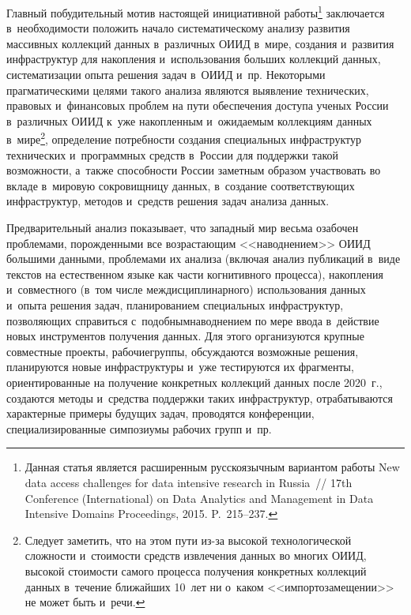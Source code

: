\begin{multicols}{2}
  Главный побудительный мотив настоящей инициативной работы\footnote{Данная статья 
является расширенным русскоязычным вариантом работы  New data access challenges for data 
intensive research in Russia~// 17th Conference (International) on Data Analytics 
and Management in Data Intensive Domains Proceedings, 2015. P.~215--237.} заключается в~необходимости положить начало 
систематическому анализу развития массивных коллекций данных в~различных ОИИД 
в~мире, создания и~развития инфраструктур для накопления и~использования больших 
коллекций данных, систематизации опыта решения задач в~ОИИД и~пр. Некоторыми 
прагматическими целями такого анализа являются выявление технических, правовых 
и~финансовых проблем на пути обеспечения доступа ученых России в~различных ОИИД 
к~уже накопленным и~ожидаемым коллекциям данных в~мире\footnote{Следует заметить, что на этом 
пути из-за высокой технологической сложности и~стоимости средств извлечения данных во многих ОИИД, высокой стоимости самого 
процесса получения конкретных коллекций данных в~течение ближайших 10~лет ни о~каком <<импортозамещении>> не может быть 
и~речи.}, определение потребности создания специальных инфраструктур технических 
и~программных средств в~России для поддержки такой возможности, а~так\-же способности 
России заметным образом участвовать во вкладе в~мировую сокровищницу данных, 
в~создание соответствующих инфраструктур, методов и~средств решения задач анализа 
данных.
  
  Предварительный анализ показывает, что западный мир весьма озабочен проблемами, 
по\-рож\-ден\-ны\-ми все возрастающим <<наводнением>> \mbox{ОИИД} большими данными, 
проблемами их анализа (включая анализ публикаций в~виде текстов на естественном языке 
как час\-ти когнитивного процесса), накопления и~совместного (в~том чис\-ле 
междисциплинарного) использования данных и~опыта решения задач, планированием 
специальных инфраструктур, позволяющих справиться с~подобным\linebreak наводнением по мере 
ввода в~действие новых инструментов получения данных. Для этого органи\-зуются 
крупные совместные проекты, рабочие\linebreak группы, обсуждаются возможные решения, 
планируются новые инфраструктуры и~уже тестируются их фрагменты, ориентированные 
на получение конкретных коллекций данных после 2020~г., создаются методы и~средства 
поддержки таких инфраструктур, отрабатываются характерные примеры будущих задач, 
проводятся конференции, специализи\-рованные симпозиумы рабочих групп и~пр.
  

\end{multicols}
